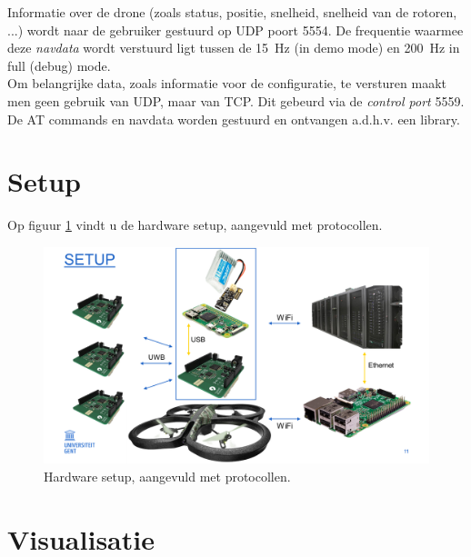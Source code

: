 Informatie over de drone (zoals status, positie, snelheid, snelheid van de rotoren, ...) wordt naar de gebruiker gestuurd op UDP poort 5554.
De frequentie waarmee deze \textit{navdata} wordt verstuurd ligt tussen de \SI{15}{\Hz} (in demo mode) en \SI{200}{\Hz} in full (debug) mode.\\
Om belangrijke data, zoals informatie voor de configuratie, te versturen maakt men geen gebruik van UDP, maar van TCP.
Dit gebeurd via de \textit{control port} 5559. \cite{developer_guide2012}\\
De AT commands en navdata worden gestuurd en ontvangen a.d.h.v. een library.

\section{Setup} \label{sec:setup_software}
Op figuur \ref{fig:setup_software} vindt u de hardware setup, aangevuld met protocollen.
\begin{figure}[p]
	\centering
	\includegraphics[width=\textwidth]{Setup}
	\caption[Hardware setup, aangevuld met protocollen]{Hardware setup, aangevuld met protocollen.}
	\label{fig:setup_software}
\end{figure}

\section{Visualisatie} \label{sec:visualization}
